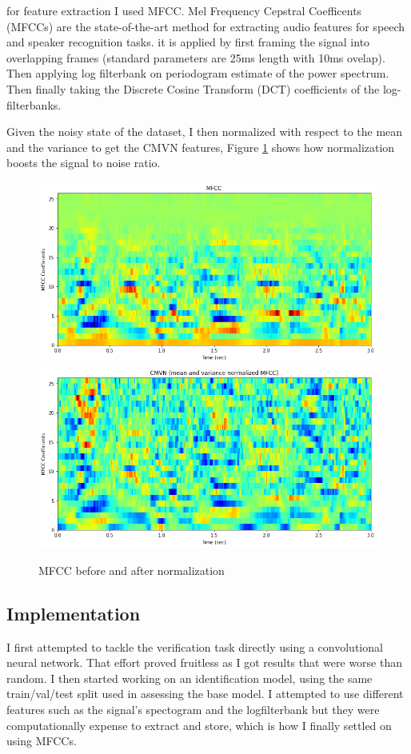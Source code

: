 \documentclass{article}
\begin{document}
for feature extraction I used MFCC. Mel Frequency Cepstral Coefficents (MFCCs) are the state-of-the-art method for extracting audio features for speech and speaker recognition tasks. it is applied by first framing the signal into overlapping frames (standard parameters are 25ms length with 10ms ovelap). Then applying log filterbank on periodogram estimate of the power spectrum. Then finally taking the Discrete Cosine Transform (DCT) coefficients of the log-filterbanks.\cite{jlyon}

Given the noisy state of the dataset, I then normalized with respect to the mean and the variance to get the CMVN features, Figure \ref{fig:normalizatin} shows how normalization boosts the signal to noise ratio.

\begin{figure}
    \includegraphics[scale=.5]{images/mfcc.png}
    \includegraphics[scale=.5]{images/cmvn.png}
    \caption{MFCC before and after normalization}
    \label{fig:normalizatin}
\end{figure}

\subsection{Implementation} \label{implementation}
I first attempted to tackle the verification task directly using a convolutional neural network. That effort proved fruitless as I got results that were worse than random. I then started working on an identification model, using the same train/val/test split used in assessing the base model. I attempted to use different features such as the signal's spectogram and the logfilterbank but they were computationally expense to extract and store, which is how I finally settled on using MFCCs.
\end{document}
